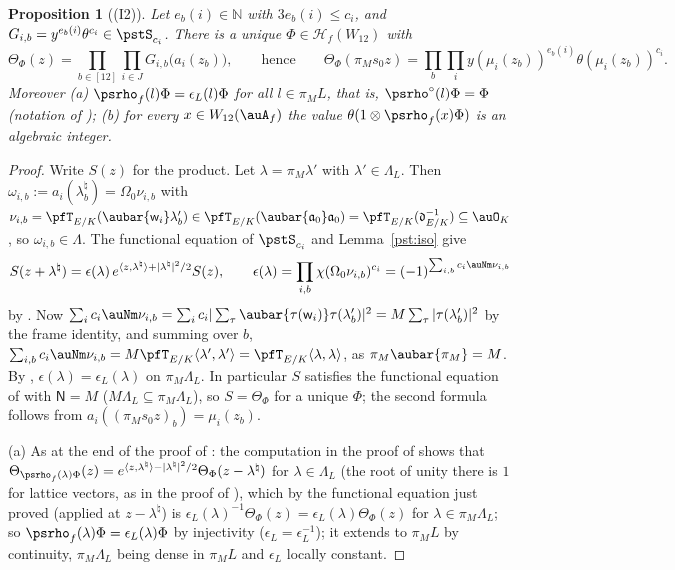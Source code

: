 \documentclass[10pt]{amsart}
\newtheorem{proposition}[theorem]{Proposition}
\theoremstyle{definition}
\theoremstyle{remark}
\newcommand{\N}{\mathbb N}
\providecommand{\psHS}{\mathcal H}
\begin{document}
\begin{proposition}[(I2)]\label{pst:I2}
Let $e_b(i)\in\N$ with $3e_b(i)\le c_i$, and $G_{i,b}=y^{e_b(i)}\theta^{c_i}\in\pstS_{c_i}$. There is a
unique $\Phi\in\psHS_f(W_{12})$ with
\[
\Theta_\Phi(z)=\prod_{b\in[12]}\prod_{i\in J}G_{i,b}\bigl(a_i(z_b)\bigr),\qquad\text{hence}\qquad
\Theta_\Phi(\pi_Ms_0z)=\prod_b\prod_iy(\mu_i(z_b))^{e_b(i)}\theta(\mu_i(z_b))^{c_i}.
\]
Moreover {\rm(a)} $\psrho_f(l)\Phi=\epsilon_L(l)\Phi$ for all $l\in\pi_ML$, that is,
$\psrho^\circ(l)\Phi=\Phi$ (notation of {\cite[Lemma~7.14]{P49}}); {\rm(b)} for every $x\in
W_{12}(\auA_f)$ the value $\theta(1\otimes\psrho_f(x)\Phi)$ is an algebraic integer.
\end{proposition}
\begin{proof}
Write $S(z)$ for the product. Let $\lambda=\pi_M\lambda'$ with $\lambda'\in\Lambda_L$. Then
$\omega_{i,b}:=a_i(\lambda^\natural_b)=\Omega_0\nu_{i,b}$ with $\nu_{i,b}=\pfT_{E/K}(\aubar{\mathsf
w_i}\lambda'_b)\in\pfT_{E/K}(\aubar{\mathfrak a_0}\mathfrak a_0)=\pfT_{E/K}(\mathfrak d_{E/K}^{-1})
\subseteq\auO_K$, so $\omega_{i,b}\in\Lambda$. The functional equation of $\pstS_{c_i}$ and
Lemma~\ref{pst:iso} give
\[
S(z+\lambda^\natural)=\epsilon(\lambda)\,e^{\langle z,\lambda^\natural\rangle+|\lambda^\natural|^2/2}
S(z),\qquad\epsilon(\lambda)=\prod_{i,b}\chi(\Omega_0\nu_{i,b})^{c_i}=(-1)^{\sum_{i,b}c_i\auNm
\nu_{i,b}}
\]
by {\cite[Lemma~7.1(b)]{P49}}. Now $\sum_ic_i\auNm\nu_{i,b}=\sum_ic_i|\sum_\tau\aubar{\tau(\mathsf w_i)}
\tau(\lambda'_b)|^2=M\sum_\tau|\tau(\lambda'_b)|^2$ by the frame identity, and summing over $b$,
$\sum_{i,b}c_i\auNm\nu_{i,b}=M\pfT_{E/K}\langle\lambda',\lambda'\rangle=\pfT_{E/K}\langle\lambda,
\lambda\rangle$, as $\pi_M\aubar{\pi_M}=M$. By {\cite[Lemma~7.4]{P49}}, $\epsilon(\lambda)=\epsilon_L(
\lambda)$ on $\pi_M\Lambda_L$. In particular $S$ satisfies the functional equation of
{\cite[Lemma~5.26]{P49}} with $\mathsf N=M$ ($M\Lambda_L\subseteq\pi_M\Lambda_L$), so $S=\Theta_\Phi$ for a
unique $\Phi$; the second formula follows from $a_i((\pi_Ms_0z)_b)=\mu_i(z_b)$.

(a) As at the end of the proof of {\cite[Lemma~7.13]{P49}}: the computation in the proof of
{\cite[Lemma~5.26]{P49}} shows that $\Theta_{\psrho_f(\lambda)\Phi}(z)=e^{\langle z,\lambda^\natural
\rangle-|\lambda^\natural|^2/2}\Theta_\Phi(z-\lambda^\natural)$ for $\lambda\in\Lambda_L$ (the root
of unity there is $1$ for lattice vectors, as in the proof of {\cite[Lemma~7.13]{P49}}), which
by the functional equation just proved (applied at $z-\lambda^\natural$) is $\epsilon_L(\lambda)^{-1}\Theta_\Phi(z)=\epsilon_L(\lambda)\Theta_\Phi(z)$ for $\lambda\in\pi_M
\Lambda_L$; so $\psrho_f(\lambda)\Phi=\epsilon_L(\lambda)\Phi$ by injectivity
($\epsilon_L=\epsilon_L^{-1}$); it extends to $\pi_ML$ by continuity, $\pi_M\Lambda_L$ being dense in
$\pi_ML$ and $\epsilon_L$ locally constant.


\end{proof}
\end{document}
